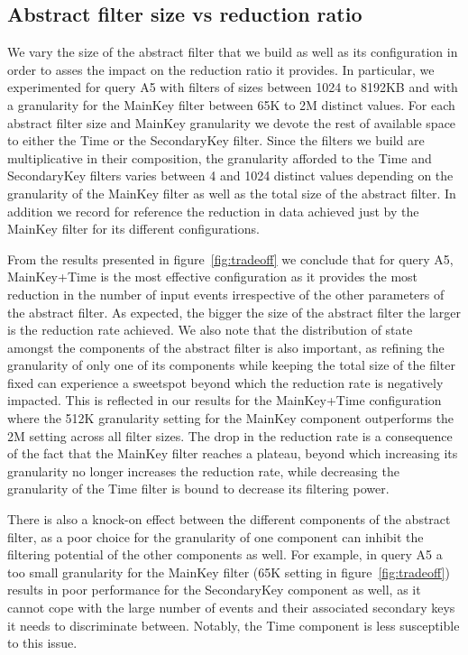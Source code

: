 \subsection{Abstract filter size vs reduction ratio}

We vary the size of the abstract filter that we build as well as its
configuration in order to asses the impact on the reduction ratio it provides.
In particular, we experimented for query A5 with filters of sizes between 1024
to 8192KB and with a granularity for the MainKey filter between 65K to 2M
distinct values. For each abstract filter size and MainKey granularity we devote
the rest of available space to either the Time or the SecondaryKey filter.
Since the filters we build are multiplicative in their composition, the
granularity afforded to the Time and SecondaryKey filters varies between 4 and
1024 distinct values depending on the granularity of the MainKey filter as well
as the total size of the abstract filter.
In addition we record for reference the reduction in data achieved just by the
MainKey filter for its different configurations.

From the results presented in figure~\ref{fig:tradeoff} we conclude that for
query A5, MainKey+Time is the most effective configuration as it provides the
most reduction in the number of input events irrespective of the other
parameters of the abstract filter. As expected, the bigger the size of the
abstract filter the larger is the reduction rate achieved.
We also note that the distribution of state amongst the components of the
abstract filter is also important, as refining the granularity of only one of
its components while keeping the total size of the filter fixed can experience a
sweetspot beyond which the reduction rate is negatively impacted.
This is reflected in our results for the MainKey+Time configuration where the
512K granularity setting for the MainKey component outperforms the 2M setting
across all filter sizes.
The drop in the reduction rate is a consequence of the fact that the MainKey
filter reaches a plateau, beyond which increasing its granularity no longer
increases the reduction rate, while decreasing the granularity of the Time
filter is bound to decrease its filtering power.

There is also a knock-on effect between the different components of the abstract
filter, as a poor choice for the granularity of one component can inhibit the
filtering potential of the other components as well.
For example, in query A5 a too small granularity for the MainKey filter (65K
setting in figure~\ref{fig:tradeoff}) results in poor performance for the
SecondaryKey component as well, as it cannot cope with the large number of
events and their associated secondary keys it needs to discriminate between.
Notably, the Time component is less susceptible to this issue. 




